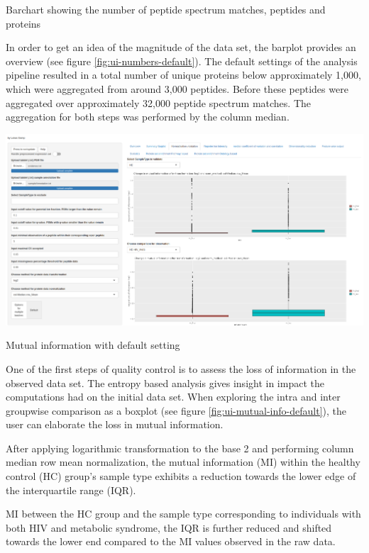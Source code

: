 \documentclass[
  11pt,
]{article}
\let\origfigure\figure
\begin{document}
\caption{Barchart showing the number of peptide spectrum matches, peptides and proteins}\label{fig:ui-numbers-default}
 \endfigure\egroup

In order to get an idea of the magnitude of the data set, the barplot provides an overview (see figure \ref{fig:ui-numbers-default}).
The default settings of the analysis pipeline resulted in a total number of unique proteins below approximately 1,000, which were aggregated from around 3,000 peptides. Before these peptides were aggregated over approximately 32,000 peptide spectrum matches. The aggregation for both steps was performed by the column median.

\newpage
\bgroup  \origfigure[H] 

{\centering \includegraphics[width=1\linewidth]{screenshots/mutual_info_default} 

}

\caption{Mutual information with default setting}\label{fig:ui-mutual-info-default}
 \endfigure\egroup

One of the first steps of quality control is to assess the loss of information in the observed data set. The entropy based analysis gives insight in impact the computations had on the initial data set. When exploring the intra and inter groupwise comparison as a boxplot (see figure \ref{fig:ui-mutual-info-default}), the user can elaborate the loss in mutual information.

After applying logarithmic transformation to the base 2 and performing column median row mean normalization, the mutual information (MI) within the healthy control (HC) group's sample type exhibits a reduction towards the lower edge of the interquartile range (IQR).

MI between the HC group and the sample type corresponding to individuals with both HIV and metabolic syndrome, the IQR is further reduced and shifted towards the lower end compared to the MI values observed in the raw data.
\end{document}
